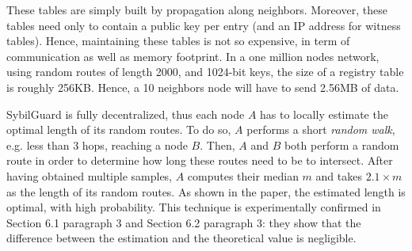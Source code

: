 \documentclass[a4paper,11pt]{article}
\begin{document}
These tables are simply built by propagation along neighbors.
Moreover, these tables need only to contain a public key per entry
(and an IP address for witness tables). Hence, maintaining these
tables is not so expensive, in term of communication as well as memory
footprint. In a one million nodes network, using random routes of
length 2000, and 1024-bit keys, the size of a registry table is
roughly 256KB.  Hence, a 10 neighbors node will have to send 2.56MB of
data.


SybilGuard is fully decentralized, thus each node $A$ has to locally
estimate the optimal length of its random routes.  To do so, $A$
performs a short \emph{random walk}, e.g. less than 3 hops, reaching a
node $B$. Then, $A$ and $B$ both perform a random route in order to
determine how long these routes need to be to intersect.  After having
obtained multiple samples, $A$ computes their median $m$ and takes
$2.1 \times m$ as the length of its random routes. As shown in the
paper, the estimated length is optimal, with high probability. This
technique is experimentally confirmed in Section 6.1 paragraph 3 and
Section 6.2 paragraph 3: they show that the difference between the
estimation and the theoretical value is negligible.

\end{document}
